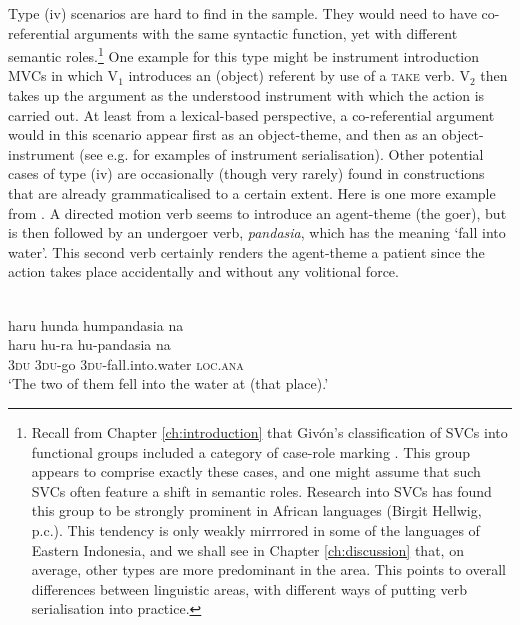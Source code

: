 Type (iv) scenarios are hard to find in the sample. They would need to have co-referential arguments with the same syntactic function, yet with different semantic roles.\footnote{Recall from Chapter \ref{ch:introduction} that Givón's classification of SVCs into functional groups included a category of case-role marking \citep{givon1991serial}. This group appears to comprise exactly these cases, and one might assume that such SVCs often feature a shift in semantic roles. Research into SVCs has found this group to be strongly prominent in African languages (Birgit Hellwig, p.c.). This tendency is only weakly mirrrored in some of the languages of Eastern Indonesia, and we shall see in Chapter \ref{ch:discussion} that, on average, other types are more predominant in the area. This points to overall differences between linguistic areas, with different ways of putting verb serialisation into practice.} One example for this type might be instrument introduction MVCs in which V$_1$ introduces an (object) referent by use of a \textsc{take} verb. V$_2$ then takes up the argument as the understood instrument with which the action is carried out. At least from a lexical-based perspective, a co-referential argument would in this scenario appear first as an object-theme, and then as an object-instrument (see e.g. \citealt[305]{Durie1997} for examples of instrument serialisation). Other potential cases of type (iv) are occasionally (though very rarely) found in constructions that are already grammaticalised to a certain extent. Here is one more example from . A directed motion verb seems to introduce an agent-theme (the goer), but is then followed by an undergoer verb, \textit{pandasia}, which has the meaning `fall into water'. This second verb certainly renders the agent-theme a patient since the action takes place accidentally and without any volitional force.

\ea 
{}\\
\glll haru hunda humpandasia na \\
haru hu-ra hu-pandasia na \\
3\textsc{du} 3\textsc{du}-go 3\textsc{du}-fall.into.water \textsc{loc}.\textsc{ana} \\
\glft `The two of them fell into the water at (that place).'\\ 
\z

